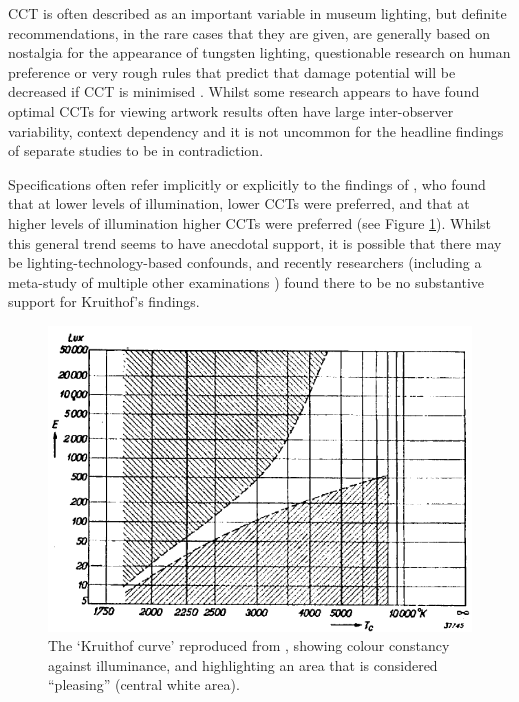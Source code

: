 \Gls{CCT} is often described as an important variable in museum lighting, but definite recommendations, in the rare cases that they are given, are generally based on nostalgia for the appearance of tungsten lighting, questionable research on human preference \citep{kruithof_tubular_1941,fotios_revised_2017} or very rough rules that predict that damage potential will be decreased if \gls{CCT} is minimised \citep{cie_cie_2004}. Whilst some research appears to have found optimal \glspl{CCT} for viewing artwork \citep{nascimento_best_2014,pinto_correlated_2008,scuello_museum_2004,scuello_museum_2004-1, liu_cultural_2013,vidovszky-nemeth_introductory_2016,feltrin_impact_2019} results often have large inter-observer variability, context dependency and it is not uncommon for the headline findings of separate studies to be in contradiction. 

Specifications often refer implicitly or explicitly to the findings of \citet{kruithof_tubular_1941}, who found that at lower levels of illumination, lower \glspl{CCT} were preferred, and that at higher levels of illumination higher \glspl{CCT} were preferred (see Figure \ref{fig:Kruithof}). Whilst this general trend seems to have anecdotal support, it is possible that there may be lighting-technology-based confounds, and recently researchers \citep{vienot_kruithofs_2009} (including a meta-study of multiple other examinations \citep{fotios_revised_2017}) found there to be no substantive support for Kruithof's findings.


\begin{figure}[htbp]
\includegraphics[max width=\textwidth]{figs/LitRev/Kruithof.png}
\caption{The `Kruithof curve' reproduced from \citet{kruithof_tubular_1941}, showing colour constancy against illuminance, and highlighting an area that is considered ``pleasing'' (central white area).}
\label{fig:Kruithof}
\end{figure}

